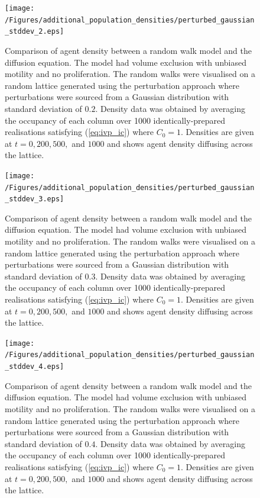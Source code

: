 \documentclass[11pt,titlepage,a4paper]{article}
\begin{document}
\begin{appendix}
		\begin{figure}[tbh]
			\centering
				\texttt{[image: /Figures/additional\_population\_densities/perturbed\_gaussian\_stddev\_2.eps]}
			\caption{Comparison of agent density between a random walk model and the diffusion equation. The model had volume exclusion with unbiased motility and no proliferation. The random walks were visualised on a random lattice generated using the perturbation approach where perturbations were sourced from a Gaussian distribution with standard deviation of $0.2$. Density data was obtained by averaging the occupancy of each column over 1000 identically-prepared realisations satisfying (\ref{eq:ivp_ic}) where $C_0 = 1$. Densities are given at $t = 0, 200, 500,$ and $1000$ and shows agent density diffusing across the lattice.}
			\label{fig:perturbed_gaussian_stddev_2}
		\end{figure}

		\begin{figure}[tbh]
			\centering
				\texttt{[image: /Figures/additional\_population\_densities/perturbed\_gaussian\_stddev\_3.eps]}
			\caption{Comparison of agent density between a random walk model and the diffusion equation. The model had volume exclusion with unbiased motility and no proliferation. The random walks were visualised on a random lattice generated using the perturbation approach where perturbations were sourced from a Gaussian distribution with standard deviation of $0.3$. Density data was obtained by averaging the occupancy of each column over 1000 identically-prepared realisations satisfying (\ref{eq:ivp_ic}) where $C_0 = 1$. Densities are given at $t = 0, 200, 500,$ and $1000$ and shows agent density diffusing across the lattice.}
			\label{fig:perturbed_gaussian_stddev_3}
		\end{figure}

		\begin{figure}[tbh]
			\centering
				\texttt{[image: /Figures/additional\_population\_densities/perturbed\_gaussian\_stddev\_4.eps]}
			\caption{Comparison of agent density between a random walk model and the diffusion equation. The model had volume exclusion with unbiased motility and no proliferation. The random walks were visualised on a random lattice generated using the perturbation approach where perturbations were sourced from a Gaussian distribution with standard deviation of $0.4$. Density data was obtained by averaging the occupancy of each column over 1000 identically-prepared realisations satisfying (\ref{eq:ivp_ic}) where $C_0 = 1$. Densities are given at $t = 0, 200, 500,$ and $1000$ and shows agent density diffusing across the lattice.}
			\label{fig:perturbed_gaussian_stddev_4}
		\end{figure}


\end{appendix}
\end{document}

